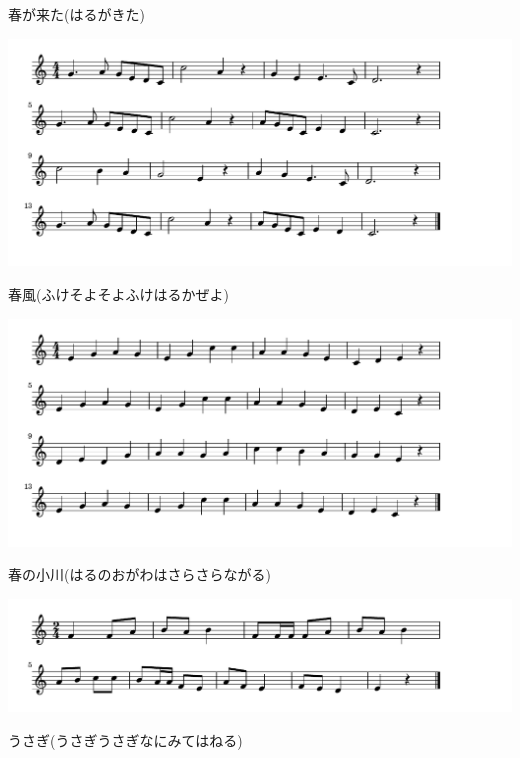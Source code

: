 \documentclass[a4paper]{ltjsarticle}
\begin{document}
\vspace{-10mm} \hspace{10mm}
春が来た(はるがきた)

\includegraphics[clip]{harukaze_crop.pdf}

\vspace{-10mm} \hspace{10mm}
春風(ふけそよそよふけはるかぜよ)

\includegraphics[clip]{harunoogawa_crop.pdf}

\vspace{-10mm} \hspace{10mm}
春の小川(はるのおがわはさらさらながる)


\includegraphics[clip]{usagi_crop.pdf}

\vspace{-10mm} \hspace{10mm}
うさぎ(うさぎうさぎなにみてはねる)
\end{document}
